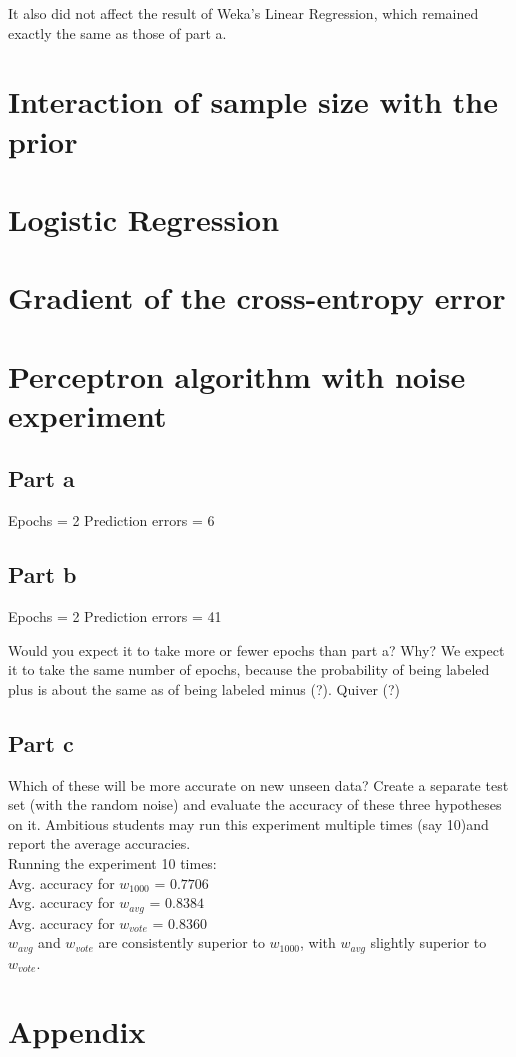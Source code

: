 \documentclass{article}
\begin{document}
It also did not affect the result of Weka's Linear Regression, which remained exactly the same as those of part a. 

\section{Interaction of sample size with the prior}

\section{Logistic Regression}

\section{Gradient of the cross-entropy error}

\section{Perceptron algorithm with noise experiment}

\subsection*{Part a}
Epochs = 2
Prediction errors = 6

\subsection*{Part b}

Epochs = 2
Prediction errors = 41

Would you expect it to take more or fewer epochs than part a? Why?
We expect it to take the same number of epochs, because the probability of being labeled plus is about the same as of being labeled minus (?). Quiver (?)


\subsection*{Part c}

Which of these will be more accurate on new unseen data? Create a separate test set (with the random noise) and evaluate the accuracy of these three hypotheses on it. Ambitious students may run this experiment multiple times (say 10)and report the average accuracies.
\\
Running the experiment 10 times: \\
Avg. accuracy for $w_{1000}$ = $0.7706$ \\
Avg. accuracy for $w_{avg}$ = $0.8384$ \\
Avg. accuracy for $w_{vote}$ = $0.8360$ \\

\noindent $w_{avg}$ and $w_{vote}$ are consistently superior to $w_{1000}$, with $w_{avg}$ slightly superior to $w_{vote}$.

\section{Appendix}

\begin{tiny}



\end{tiny}
\end{document}
